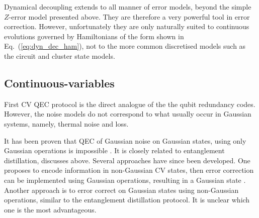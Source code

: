 Dynamical decoupling extends to all manner of error models, beyond the simple $Z$-error model presented above. They are therefore a very powerful tool in error correction. However, unfortunately they are only naturally suited to continuous evolutions governed by Hamiltonians of the form shown in Eq.~(\ref{eq:dyn_dec_ham}), not to the more common discretised models such as the circuit and cluster state models.


%
%

\subsection{Continuous-variables}

First CV QEC protocol is the direct analogue of the the qubit redundancy codes. However, the noise models do not correspond to what usually occur in Gaussian systems, namely, thermal noise and loss.

It has been proven that QEC of Gaussian noise on Gaussian states, using only Gaussian operations is impossible \cite{bib:PhysRevLett.102.120501}. It is closely related to entanglement distillation, discusses above. Several approaches have since been developed. One proposes to encode information in non-Gaussian CV states, then error correction can be implemented using Gaussian operations, resulting in a Gaussian state \cite{bib:pirandola2004constructing}. Another approach is to error correct on Gaussian states using non-Gaussian operations, similar to the entanglement distillation protocol. It is unclear which one is the most advantageous.

